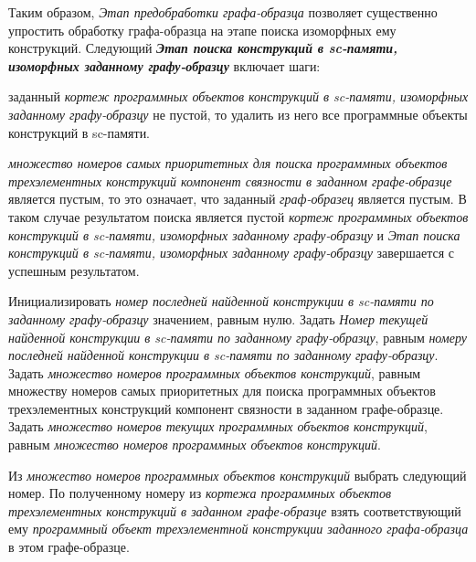 Таким образом, \textit{Этап предобработки графа-образца} позволяет существенно упростить обработку графа-образца на этапе поиска изоморфных ему конструкций. Следующий \textbf{\textit{Этап поиска конструкций в sc-памяти, изоморфных заданному графу-образцу}} включает  шаги:
\begin{textitemize}
	\item {} заданный \textit{кортеж программных объектов конструкций в sc-памяти, изоморфных заданному графу-образцу} не пустой, то удалить из него все программные объекты конструкций в sc-памяти.
	\item {} \textit{множество номеров самых приоритетных для поиска программных объектов трехэлементных конструкций компонент связности в заданном графе-образце} является пустым, то это означает, что заданный \textit{граф-образец} является пустым. В таком случае результатом поиска является пустой \textit{кортеж программных объектов конструкций в sc-памяти, изоморфных заданному графу-образцу} и \textit{Этап поиска конструкций в sc-памяти, изоморфных заданному графу-образцу} завершается с успешным результатом.
	\item Инициализировать \textit{номер последней найденной конструкции в sc-памяти по заданному графу-образцу} значением, равным нулю. Задать \textit{Номер текущей найденной конструкции в sc-памяти по заданному графу-образцу}, равным \textit{номеру последней найденной конструкции в sc-памяти по заданному графу-образцу}. Задать \textit{множество номеров  программных объектов конструкций}, равным {множеству номеров самых приоритетных для поиска программных объектов трехэлементных конструкций компонент связности в заданном графе-образце}. Задать \textit{множество номеров текущих программных объектов конструкций}, равным \textit{множество номеров  программных объектов конструкций}.
	\item Из \textit{множество номеров  программных объектов конструкций} выбрать следующий номер. По полученному номеру из \textit{кортежа программных объектов трехэлементных конструкций в заданном графе-образце} взять соответствующий ему \textit{программный объект трехэлементной конструкции заданного графа-образца} в этом графе-образце.

\end{textitemize}
